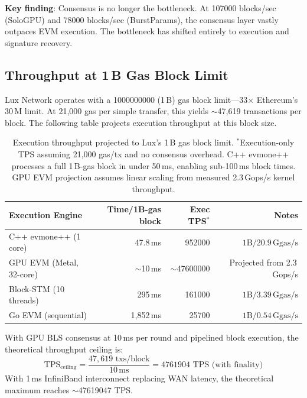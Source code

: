 \textbf{Key finding}: Consensus is no longer the bottleneck. At \num{107000} blocks/sec
(SoloGPU) and \num{78000} blocks/sec (BurstParams), the consensus layer vastly outpaces
EVM execution. The bottleneck has shifted entirely to execution and signature recovery.

\subsection{Throughput at 1\,B Gas Block Limit}

Lux Network operates with a \num{1000000000} (1\,B) gas block limit---33$\times$ Ethereum's
30\,M limit. At 21{,}000 gas per simple transfer, this yields $\sim$47{,}619 transactions
per block. The following table projects execution throughput at this block size.

\begin{table}[h]
\centering
\small
\begin{tabular}{lrrr}
\toprule
\textbf{Execution Engine} & \textbf{Time/1B-gas block} & \textbf{Exec TPS$^*$} & \textbf{Notes} \\
\midrule
C++ evmone++ (1 core)    & 47.8\,ms  & \num{952000}     & $1\text{B} / 20.9\,\text{Ggas/s}$ \\
GPU EVM (Metal, 32-core) & $\sim$10\,ms & $\sim$\num{47600000} & Projected from 2.3\,Gops/s \\
Block-STM (10 threads)   & 295\,ms   & \num{161000}     & $1\text{B} / 3.39\,\text{Ggas/s}$ \\
Go EVM (sequential)      & 1{,}852\,ms & \num{25700}    & $1\text{B} / 0.54\,\text{Ggas/s}$ \\
\bottomrule
\end{tabular}
\caption{Execution throughput projected to Lux's 1\,B gas block limit.
$^*$Execution-only TPS assuming 21{,}000 gas/tx and no consensus overhead.
C++ evmone++ processes a full 1\,B-gas block in under 50\,ms, enabling
sub-100\,ms block times. GPU EVM projection assumes linear scaling from
measured 2.3\,Gops/s kernel throughput.}
\label{tab:1b-gas}
\end{table}

With GPU BLS consensus at 10\,ms per round and pipelined block execution,
the theoretical throughput ceiling is:
\begin{equation}
\text{TPS}_{\text{ceiling}} = \frac{47{,}619\text{ txs/block}}{10\,\text{ms}} = \num{4761904}\text{ TPS (with finality)}
\end{equation}
With 1\,ms InfiniBand interconnect replacing WAN latency, the theoretical
maximum reaches $\sim$\num{47619047} TPS.

